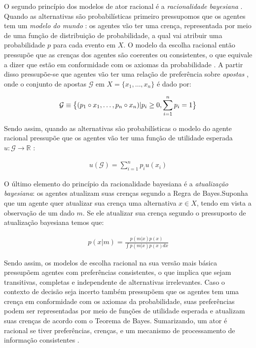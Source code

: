 O segundo princípio dos modelos de ator racional é a \textit{racionalidade
  bayesiana} \cite{gintis2016individuality}. Quando as alternativas são
probabilísticas primeiro pressupomos que os agentes tem um \textit{modelo do
  mundo} \cite{acemoglu2011opinion}: os agentes vão ter uma crença, representada
por meio de uma função de distribuição de probabilidade, a qual vai atribuir uma
probabilidade \(p\) para cada evento em \(X\). O modelo da escolha racional
então pressupõe que as crenças dos agentes são coerentes ou consistentes, o que
equivale a dizer que estão em conformidade com os axiomas da probabilidade
\cite{jackman2009bayesian}. A partir disso pressupõe-se que agentes vão ter uma
relação de preferência sobre \textit{apostas} \cite{jehle2001advanced}, onde o
conjunto de apostas \(\mathcal{G}\) em \(X = \{ x_1, \ldots, x_n \}\) é dado
por:

\begin{align*}
  \mathcal{G} \equiv \big{\{}  (p_1 \circ x_1, \ldots, p_n \circ x_n  ) | p_i \geq 0, \sum_{i = 1 }^n p_i = 1  \big{\}}  
\end{align*}

Sendo assim, quando as alternativas são probabilísticas o modelo do agente
racional pressupõe que os agentes vão ter uma função de utilidade esperada \(u:
\mathcal{G} \to \mathbb{R} \)
\cite{jehle2001advanced,sep-rationality-normative-utility}:

\begin{align*}
  u(\mathcal{G}) = \sum_{i =1}^n p_i u(x_i)
\end{align*}

O último elemento do princípio da racionalidade bayesiana é a
\textit{atualização bayesiana}\cite[p.104]{gintis2016individuality}: os agentes
atualizam suas crenças segundo a Regra de Bayes.Suponha que um agente quer
atualizar sua crença uma alternativa \(x \in X\), tendo em vista a observação de
um dado \(m\). Se ele atualizar sua crença segundo o pressuposto de atualização
bayesiana temos que:

\begin{align*}
  p(x|m) =
  \frac{p(m|x)
  p(x)}
  {\int p(m|x)
  p(x)
  dx}
\end{align*}

Sendo assim, os modelos de escolha racional na sua versão mais básica pressupõem
agentes com preferências consistentes, o que implica que sejam transitivas,
completas e independente de alternativas irrelevantes. Caso o contexto de
decisão seja incerto também pressupõem que os agentes tem uma crença em
conformidade com os axiomas da probabilidade, suas preferências podem ser
representadas por meio de funções de utilidade esperada e atualizam suas crenças
de acordo com o Teorema de Bayes. Sumarizando, um ator é racional se tiver
preferências, crenças, e um mecanismo de processamento de informação
consistentes \cite{binmore2008rational}.


